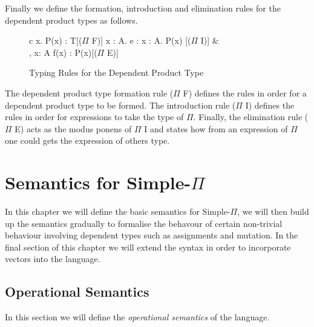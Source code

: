 \documentclass[a4paper,12pt]{report}
\begin{document}
\par
Finally we define the formation, introduction and elimination rules for 
the dependent product types as follows.

\begin{figure}[H]
  \begin{center}
    \begin{tabular} {c}
        {\Gamma \vdash \Pi x. P(x) : T}[($\Pi$ F)] \text{ }
        {\Gamma \vdash \lambda x : A. e : \Pi x : A. P(x) }[($\Pi$ I)] & \\
        {\Gamma, x: A \vdash f(x) : P(x)}[($\Pi$ E)] \text{ }
    \end{tabular}
  \end{center}
  \caption{Typing Rules for the Dependent Product Type}
\end{figure}

\par
The dependent product type formation rule ($\Pi$ F) defines the rules in order 
for a dependent product type to be formed. The introduction rule ($\Pi$ I) 
defines the rules in order for expressions to take the type of $\Pi$. Finally, 
the elimination rule ($\Pi$ E) acts as the modus ponens of $\Pi$ I and states 
how from an expression of $\Pi$ one could gets the expression of others type. 


\chapter{Semantics for Simple-$\Pi$}
In this chapter we will define the basic semantics for Simple-$\Pi$, we will 
then build up the semantics gradually to formalise the behavour of certain 
non-trivial behaviour involving dependent types such as assignments and 
mutation. In the final section of this chapter we will extend the syntax in 
order to incorporate vectors into the language.

\section{Operational Semantics}
In this section we will define the \textit{operational semantics} 
\cite{operationalSemantics} of the language.
\end{document}
